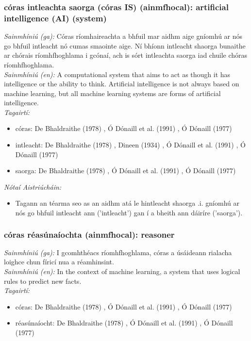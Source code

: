 \subsubsection*{córas intleachta saorga (córas IS) (ainmfhocal): artificial intelligence (AI) (system)}
 \noindent \textit{Sainmhíniú (ga):} Córas ríomhaireachta a bhfuil mar aidhm aige gníomhú ar nós go bhfuil intleacht nó cumas smaointe aige. Ní bhíonn intleacht shaorga bunaithe ar chórais ríomhfhoghlama i gcónaí, ach is sórt intleachta saorga iad chuile chóras ríomhfhoghlama.
\\
 \noindent \textit{Sainmhíniú (en):} A computational system that aims to act as though it has intelligence or the ability to think. Artificial intelligence is not always based on machine learning, but all machine learning systems are forms of artificial intelligence.
\\
 \noindent \textit{Tagairtí:}
\begin{itemize}
	\item córas: De Bhaldraithe (1978) \cite{de-bhaldraithe}, Ó Dónaill et al. (1991) \cite{focloir-beag}, Ó Dónaill (1977) \cite{odonaill}
	\item intleacht: De Bhaldraithe (1978) \cite{de-bhaldraithe}, Dineen (1934) \cite{dineen}, Ó Dónaill et al. (1991) \cite{focloir-beag}, Ó Dónaill (1977) \cite{odonaill}
	\item saorga: De Bhaldraithe (1978) \cite{de-bhaldraithe}, Ó Dónaill et al. (1991) \cite{focloir-beag}, Ó Dónaill (1977) \cite{odonaill}
\end{itemize}

 \noindent \textit{Nótaí Aistriúcháin:}
\begin{itemize}
	\item Tagann an téarma seo as an aidhm atá le hintleacht shaorga .i. gníomhú ar nós go bhfuil intleacht ann ('intleacht') gan í a bheith ann dáiríre ('saorga').
\end{itemize}


\subsubsection*{córas réasúnaíochta (ainmfhocal): reasoner}
 \noindent \textit{Sainmhíniú (ga):} I gcomhthéacs ríomhfhoghlama, córas a úsáideann rialacha loighce chun fíricí nua a réamhinsint.
\\
 \noindent \textit{Sainmhíniú (en):} In the context of machine learning, a system that uses logical rules to predict new facts.
\\
 \noindent \textit{Tagairtí:}
\begin{itemize}
	\item córas: De Bhaldraithe (1978) \cite{de-bhaldraithe}, Ó Dónaill et al. (1991) \cite{focloir-beag}, Ó Dónaill (1977) \cite{odonaill}
	\item réasúnaíocht: De Bhaldraithe (1978) \cite{de-bhaldraithe}, Ó Dónaill et al. (1991) \cite{focloir-beag}, Ó Dónaill (1977) \cite{odonaill}
\end{itemize}

